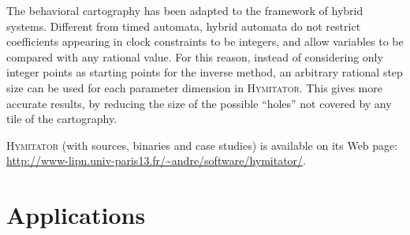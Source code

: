 \documentclass{llncs}
\newcommand{\hymitator}{\textsc{Hymitator}}
\newcommand{\commentaire}[1]{}
\begin{document}

The behavioral cartography has been adapted to the framework of hybrid systems.
Different  from timed automata, hybrid automata do not restrict coefficients appearing in clock constraints to be integers, and allow variables to be compared with any rational value.
For this reason, instead of considering only integer points as starting points for the inverse method, an arbitrary rational step size can be used for each parameter dimension in \hymitator{}.
This gives more accurate results, by reducing the size of the possible ``holes'' not covered by any tile of the cartography.

\hymitator{} (with sources, binaries and case studies) is available on its Web page: \url{http://www-lipn.univ-paris13.fr/~andre/software/hymitator/}.



\section{Applications}
\end{document}
